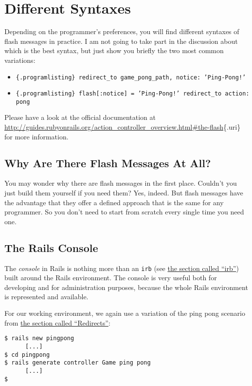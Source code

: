\documentclass[a4paper]{book}
\newcommand{\chap}[1]{\newpage\thispagestyle{empty}\chapter{#1}\label{chap:\thechapter}}
\begin{document}
\chap{Different Syntaxes}\label{different-syntaxes}

Depending on the programmer's preferences, you will find different syntaxes of flash messages in practice. I am not going to take part in the discussion about which is the best syntax, but just show you briefly the two most common variations:

\begin{itemize}
\item
  \texttt{\{.programlisting\}     redirect\_to game\_pong\_path, notice: 'Ping-Pong!'}
\item
  \texttt{\{.programlisting\}     flash{[}:notice{]} = 'Ping-Pong!'     redirect\_to action: pong}
\end{itemize}

Please have a look at the official documentation at \url{http://guides.rubyonrails.org/action_controller_overview.html\#the-flash}\{.uri\} for more information.

\section{Why Are There Flash Messages At All?}\label{why-are-there-flash-messages-at-all}

You may wonder why there are flash messages in the first place. Couldn't you just build them yourself if you need them? Yes, indeed. But flash messages have the advantage that they offer a defined approach that is the same for any programmer. So you don't need to start from scratch every single time you need one.

\section{The Rails Console}\label{the-rails-console}

The \emph{console} in Rails is nothing more than an \texttt{irb} (see \hyperref[irb]{the section called “irb”}) built around the Rails environment. The console is very useful both for developing and for administration purposes, because the whole Rails environment is represented and available.

For our working environment, we again use a variation of the ping pong scenario from \hyperref[redirects]{the section called “Redirects”}:

\begin{shaded}\begin{verbatim}
$ rails new pingpong
      [...]
$ cd pingpong
$ rails generate controller Game ping pong
      [...]
$
\end{verbatim}\end{shaded}
\end{document}
